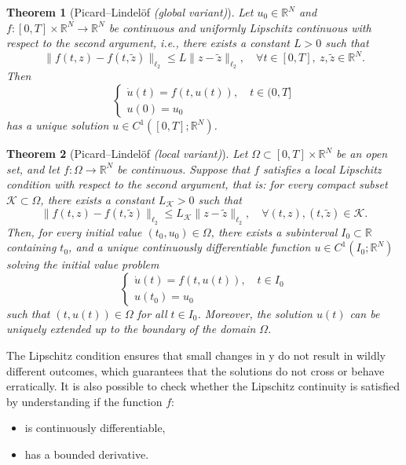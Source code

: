 \documentclass[11pt]{article}
\newtheorem{theorem}{Theorem}[section]
\begin{document}
\begin{theorem}[Picard–Lindelöf \textit{(global variant)}]\label{PLG}
Let \( u_0 \in \mathbb{R}^N \) and \( f : [0,T] \times \mathbb{R}^N \to \mathbb{R}^N \) be continuous and uniformly Lipschitz continuous with respect to the second argument, i.e., there exists a constant \( L > 0 \) such that
\[
\|f(t, z) - f(t, \tilde{z})\|_{\ell_2} \leq L \|z - \tilde{z}\|_{\ell_2}, \quad \forall t \in [0,T], \ z, \tilde{z} \in \mathbb{R}^N.
\]
Then 
\[
\begin{cases}
    \dot{u}(t) = f(t, u(t)), \quad t \in (0, T] \\
    u(0) = u_0
\end{cases}
\]
has a unique solution \( u \in C^1([0,T]; \mathbb{R}^N) \).
\end{theorem}

\begin{theorem}[Picard–Lindelöf \textit{(local variant)}]\label{PLL}
Let \( \Omega \subset [0,T] \times \mathbb{R}^N \) be an open set, and let \( f : \Omega \to \mathbb{R}^N \) be continuous. Suppose that \( f \) satisfies a local Lipschitz condition with respect to the second argument, that is: for every compact subset \( \mathcal{K} \subset \Omega \), there exists a constant \( L_\mathcal{K} > 0 \) such that
\[
\|f(t, z) - f(t, \tilde{z})\|_{\ell_2} \leq L_\mathcal{K} \|z - \tilde{z}\|_{\ell_2}, \quad \forall (t, z), (t, \tilde{z}) \in \mathcal{K}.
\]
Then, for every initial value \( (t_0, u_0) \in \Omega \), there exists a subinterval \( I_0 \subset \mathbb{R} \) containing \( t_0 \), and a unique continuously differentiable function \( u \in C^1(I_0; \mathbb{R}^N) \) solving the initial value problem
\[
\begin{cases}
\dot{u}(t) = f(t, u(t)), \quad t \in I_0 \\
u(t_0) = u_0
\end{cases}
\]
such that \( (t, u(t)) \in \Omega \) for all \( t \in I_0 \). Moreover, the solution \( u(t) \) can be uniquely extended up to the boundary of the domain \( \Omega \).
\end{theorem}




The Lipschitz condition ensures that small changes in y do not result in wildly different outcomes, which guarantees that the solutions do not cross or behave erratically. It is also possible to check whether the Lipschitz continuity is satisfied by understanding if the function $f$:
\begin{itemize}
    \item is continuously differentiable,
    \item has a bounded derivative.
\end{itemize}
\end{document}
